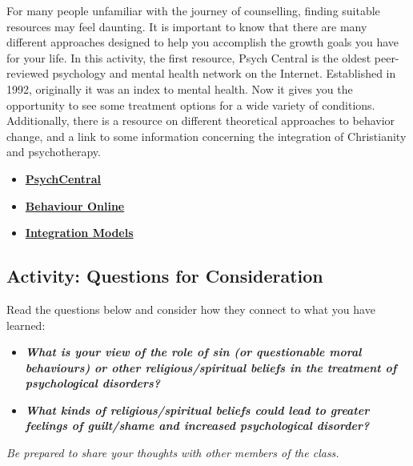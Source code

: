 \documentclass[
]{book}
\providecommand{\tightlist}{%
  \setlength{\itemsep}{0pt}\setlength{\parskip}{0pt}}
\begin{document}
\begin{reflect}
For many people unfamiliar with the journey of counselling, finding suitable resources may feel daunting. It is important to know that there are many different approaches designed to help you accomplish the growth goals you have for your life. In this activity, the first resource, Psych Central is the oldest peer-reviewed psychology and mental health network on the Internet. Established in 1992, originally it was an index to mental health. Now it gives you the opportunity to see some treatment options for a wide variety of conditions. Additionally, there is a resource on different theoretical approaches to behavior change, and a link to some information concerning the integration of Christianity and psychotherapy.

\begin{itemize}
\item
  \href{https://psychcentral.com/}{\textbf{PsychCentral}}
\item
  \href{http://www.behavior.net}{\textbf{Behaviour Online}}
\item
  \href{http://www.psyche.gr/lpsycrel.htm}{\textbf{Integration Models}}
\end{itemize}
\end{reflect}

\hypertarget{activity-questions-for-consideration-18}{%
\subsection*{Activity: Questions for Consideration}\label{activity-questions-for-consideration-18}}

\begin{reflect}
Read the questions below and consider how they connect to what you have learned:

\begin{itemize}
\tightlist
\item
  \textbf{\emph{What is your view of the role of sin (or questionable moral behaviours) or other religious/spiritual beliefs in the treatment of psychological disorders?}}\\
\item
  \textbf{\emph{What kinds of religious/spiritual beliefs could lead to greater feelings of guilt/shame and increased psychological disorder?}}
\end{itemize}

\emph{Be prepared to share your thoughts with other members of the class.}
\end{reflect}
\end{document}
